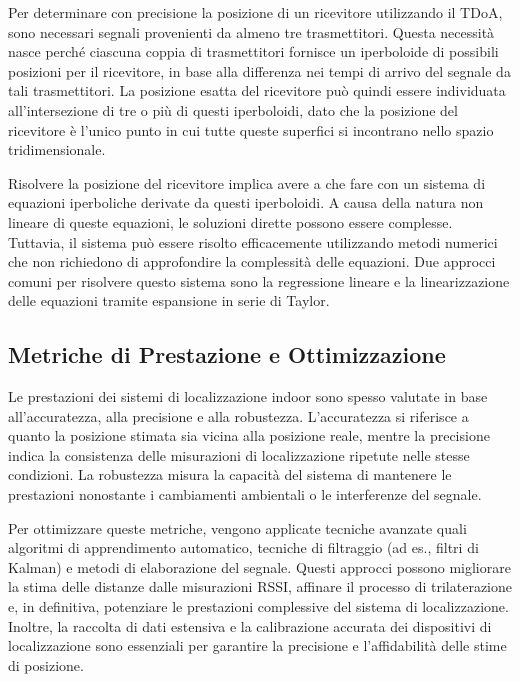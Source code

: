 Per determinare con precisione la posizione di un ricevitore utilizzando il TDoA, sono necessari segnali provenienti da almeno tre trasmettitori. Questa necessità nasce perché ciascuna coppia di trasmettitori fornisce un iperboloide di possibili posizioni per il ricevitore, in base alla differenza nei tempi di arrivo del segnale da tali trasmettitori. La posizione esatta del ricevitore può quindi essere individuata all’intersezione di tre o più di questi iperboloidi, dato che la posizione del ricevitore è l’unico punto in cui tutte queste superfici si incontrano nello spazio tridimensionale.

Risolvere la posizione del ricevitore implica avere a che fare con un sistema di equazioni iperboliche derivate da questi iperboloidi. A causa della natura non lineare di queste equazioni, le soluzioni dirette possono essere complesse. Tuttavia, il sistema può essere risolto efficacemente utilizzando metodi numerici che non richiedono di approfondire la complessità delle equazioni. Due approcci comuni per risolvere questo sistema sono la regressione lineare e la linearizzazione delle equazioni tramite espansione in serie di Taylor.


\subsection{Metriche di Prestazione e Ottimizzazione}
\hspace{\parindent}Le prestazioni dei sistemi di localizzazione indoor sono spesso valutate in base all'accuratezza, alla precisione e alla robustezza. L'accuratezza si riferisce a quanto la posizione stimata sia vicina alla posizione reale, mentre la precisione indica la consistenza delle misurazioni di localizzazione ripetute nelle stesse condizioni. La robustezza misura la capacità del sistema di mantenere le prestazioni nonostante i cambiamenti ambientali o le interferenze del segnale.

Per ottimizzare queste metriche, vengono applicate tecniche avanzate quali algoritmi di apprendimento automatico, tecniche di filtraggio (ad es., filtri di Kalman) e metodi di elaborazione del segnale. Questi approcci possono migliorare la stima delle distanze dalle misurazioni RSSI, affinare il processo di trilaterazione e, in definitiva, potenziare le prestazioni complessive del sistema di localizzazione.  Inoltre, la raccolta di dati estensiva e la calibrazione accurata dei dispositivi di localizzazione sono essenziali per garantire la precisione e l'affidabilità delle stime di posizione.